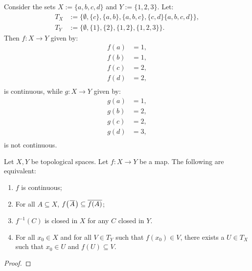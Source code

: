 \begin{example}
    Consider the sets $X := \{a,b,c,d\}$ and $Y := \{1,2,3\}$. Let:
        \begin{equation*}
        \begin{split}
            T_X &:= \{\emptyset, \{c\}, \{a,b\}, \{a,b,c\}, \{c,d\} \{a,b,c,d\}\},\\
            T_Y &:= \{\emptyset, \{1\}, \{2\}, \{1,2\}, \{1,2,3\}\}.
        \end{split}
        \end{equation*}
    Then $f:X \rightarrow Y$ given by:
        \begin{equation*}
        \begin{split}
            f(a) &= 1, \\
            f(b) &= 1, \\
            f(c) &= 2, \\
            f(d) &= 2, \\
        \end{split}
        \end{equation*}
    is continuous, while $g:X \rightarrow Y$ given by:
        \begin{equation*}
        \begin{split}
            g(a) &= 1, \\
            g(b) &= 2, \\
            g(c) &= 2, \\
            g(d) &= 3, \\
        \end{split}
        \end{equation*}
    is not continuous.
\end{example}

\begin{proposition}\label{prop:continuity-equivalences}
    Let $X,Y$ be topological spaces. Let $f:X \rightarrow Y$ be a map. The following are equivalent:
        \begin{enumerate}[label = (\arabic*),itemsep=1pt,topsep=3pt]
            \item $f$ is continuous;
            \item For all $A \subseteq X$, $f\bigl(\h1\overline{A}\h1\bigr) \subseteq \overline{f(A)}$;
            \item $f^{-1}(C)$ is closed in $X$ for any $C$ closed in $Y$.
            \item For all $x_0 \in X$ and for all $V \in T_Y$ such that $f(x_0) \in V$, there exists a $U \in T_X$ such that $x_0 \in U$ and $f(U) \subseteq V$.
        \end{enumerate}
\end{proposition}
    {\color{red} \begin{proof}
        
    \end{proof}}


